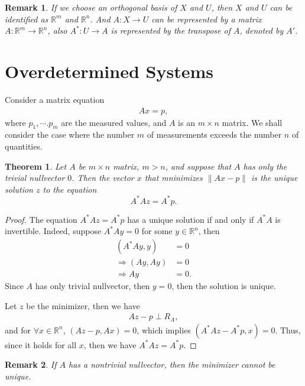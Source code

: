 \documentclass[11pt]{book}
\newtheorem{theorem}{Theorem}[section]
\newtheorem{remark}{Remark}[section]
\theoremstyle{definition}
\numberwithin{equation}{chapter}
\begin{document}
\begin{remark}
If we choose an orthogonal basis of $X$ and $U$, then $X$ and $U$ can be identified as $\mathbb{R}^m$ and $\mathbb{R}^n$. And $A:X\to U$ can be represented by a matrix $A:\mathbb{R}^m\to \mathbb{R}^n$, also $A^*:U\to A$ is represented by the transpose of $A$, denoted by $A'$.
\end{remark}

\section{Overdetermined Systems}

Consider a matrix equation
\begin{align*}
    Ax = p,
\end{align*}
where $p_1,\cdots.p_m$ are the measured values, and $A$ is an $m\times n$ matrix. We shall
consider the case where the number $m$ of measurements exceeds the number $n$ of quantities. 

\medskip

\begin{theorem}
Let $A$ be $m\times n$ matrix, $m > n$, and suppose that $A$ has only the trivial nullvector $0$. Then the vector $x$ that mninimizes $\|Ax - p\|$ is the unique solution $z$ to the equation
$$A^* A z = A^* p.$$
\end{theorem}
\begin{proof}
The equation $A^* A z = A^* p$ has a unique solution if and only if $A^* A$ is invertible. Indeed, suppose $A^* Ay = 0$ for some $y \in \mathbb{R}^n$, then 
\begin{align*}
    (A^* A y, y) & = 0 \\
    \Rightarrow (Ay, Ay) & = 0 \\
    \Rightarrow Ay & = 0.
\end{align*}
Since $A$ has only trivial nullvector, then $y = 0$, then the solution is unique.

Let $z$ be the minimizer, then we have
\begin{align*}
    Az - p \perp R_A,
\end{align*}
and for $\forall x\in\mathbb{R}^n$, $(Az - p, Ax) = 0$, which implies $(A^*Az - A^*p, x) = 0$. Thus, since it holds for all $x$, then we have $A^*Az = A^*p$.
\end{proof}

\begin{remark}
If $A$ has a nontrivial nullvector, then the minimizer cannot be unique.
\end{remark}
\end{document}
